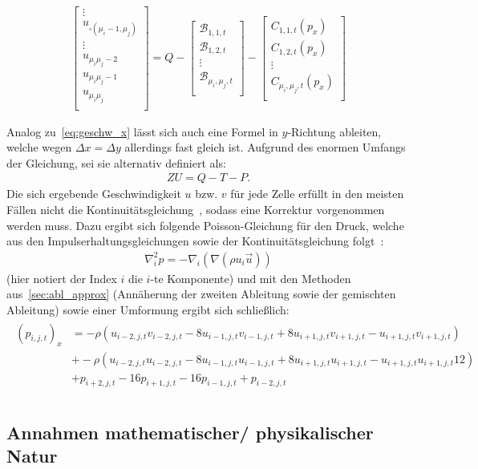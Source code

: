 {\begin{minipage}{\textheight}
\begin{align}
\begin{bmatrix}
        \vdots \\
        u_{\square(\mu_i - 1, \mu_j)} \\
        \vdots \\
        u_{\mu_i \mu_j - 2} \\
        u_{\mu_i \mu_j - 1} \\
        u_{\mu_i \mu_j} \\
    \end{bmatrix}
    =
    Q- \begin{bmatrix}
        \mathcal{B}_{1,1,t} \\
        \mathcal{B}_{1,2,t} \\
        \vdots \\
        \mathcal{B}_{\mu_i, \mu_j, t} \\
    \end{bmatrix}
    -
    \begin{bmatrix}
        C_{1,1,t}(p_x) \\
        C_{1,2,t}(p_x) \\
        \vdots \\
        C_{\mu_i,\mu_j,t}(p_x) \\
    \end{bmatrix}
\end{align}
\end{minipage}
}
Analog zu~\eqref{eq:geschw_x} lässt sich auch eine Formel in $y$-Richtung ableiten, welche wegen $\Delta x = \Delta y$ allerdings fast gleich ist. Aufgrund des enormen Umfangs der Gleichung, sei sie alternativ definiert als:
\begin{align}
\label{eq:geschw_x_einf}
    Z U = Q - T - P.
\end{align}
Die sich ergebende Geschwindigkeit $u$ bzw. $v$ für jede Zelle erfüllt in den meisten Fällen nicht die Kontinuitätsgleichung~\cite[nach][s. 213]{ferziger_computational_2020}, sodass eine Korrektur vorgenommen werden muss. Dazu ergibt sich folgende Poisson-Gleichung für den Druck, welche aus den Impulserhaltungsgleichungen sowie der Kontinuitätsgleichung folgt~\cite[siehe][S. 194]{ferziger_computational_2020}:
\begin{align}
    \nabla_i ^2p = -\nabla_i\left( \nabla (\rho u_i \vec{u}) \right)
\end{align}
(hier notiert der Index $i$ die $i$-te Komponente) und mit den Methoden aus~\autoref{sec:abl_approx} (Annäherung der zweiten Ableitung sowie der gemischten Ableitung) sowie einer Umformung ergibt sich schließlich:
\begin{align}
    \begin{split}
    (p_{i,j,t})_x &= -\rho \left(u_{i-2,j,t}v_{i-2,j,t}-8u_{i-1,j,t}v_{i-1,j,t}+8u_{i+1,j,t}v_{i+1,j,t}-u_{i+1,j,t}v_{i+1,j,t} \right)\\
    &+ -\rho \left(u_{i-2,j,t}u_{i-2,j,t}-8u_{i-1,j,t}u_{i-1,j,t}+8u_{i+1,j,t}u_{i+1,j,t}-u_{i+1,j,t}u_{i+1,j,t}12 \right)\\
    &+ p_{i+2,j,t} - 16p_{i+1,j,t} - 16p_{i-1,j,t} + p_{i-2,j,t} \\
    \end{split}
\end{align}

\subsection{Annahmen mathematischer/ physikalischer Natur}